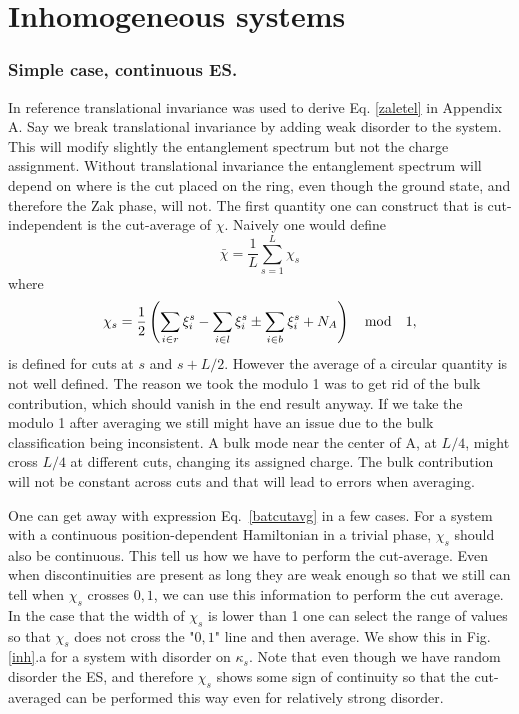 \documentclass[twocolumn,amsmath,longbibliography,amssymb,superscriptaddress]{revtex4-1}
\begin{document}
\section{Inhomogeneous systems}

\subsubsection{Simple case, continuous ES.}

In reference \cite{Zaletel2014} translational invariance was used to derive Eq. \ref{zaletel} in Appendix A. Say we break translational invariance by adding weak disorder to the system. This will modify slightly the entanglement spectrum but not the charge assignment. Without translational invariance the entanglement spectrum will depend on where is the cut placed on the ring, even though the ground state, and therefore the Zak phase, will not. The first quantity one can construct that is cut-independent is the cut-average of $\chi$. Naively one would define
\begin{equation}
\bar{\chi} = \frac{1}{L}\sum_{s=1}^L \chi_s
\label{batcutavg}
\end{equation}
where
\begin{equation}
\chi_s = \frac{1}{2} \left( \sum_{i\in r}\xi^s_i-\sum_{i\in l}\xi^s_i \pm \sum_{i\in b}\xi^s_i  + N_A \right) \quad {\rm mod} \quad 1,
\end{equation}
is defined for cuts at $s$ and $s+L/2$. However the average of a circular quantity is not well defined. The reason we took the modulo 1 was to get rid of the bulk contribution, which should vanish in the end result anyway. If we take the modulo 1 after averaging we still might have an issue due to the bulk classification being inconsistent. A bulk mode near the center of A, at $L/4$, might cross $L/4$ at different cuts, changing its assigned charge. The bulk contribution will not be constant across cuts and that will lead to errors when averaging. 

One can get away with expression Eq.~\eqref{batcutavg} in a few cases. For a system with a continuous position-dependent Hamiltonian in a trivial phase, $\chi_s$ should also be continuous. This tell us how we have to perform the cut-average. Even when discontinuities are present as long they are weak enough so that we still can tell when $\chi_s$ crosses $0,1$, we can use this information to perform the cut average. In the case that the width of $\chi_s$ is lower than 1 one can select the range of values so that $\chi_s$ does not cross the "$0,1$" line and then average. We show this in Fig.\ref{inh}.a for a system with disorder on $\kappa_s$. Note that even though we have random disorder the ES, and therefore $\chi_s$ shows some sign of continuity so that the cut-averaged can be performed this way even for relatively strong disorder.
\end{document}
